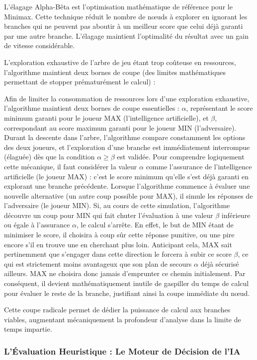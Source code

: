 \documentclass[a4paper]{article}
\begin{document}
L'élagage Alpha-Bêta est l'optimisation mathématique de référence pour le Minimax. Cette technique réduit le nombre de nœuds à explorer en ignorant les branches qui ne peuvent pas aboutir à un meilleur score que celui déjà garanti par une autre branche. L'élagage maintient l'optimalité du résultat avec un gain de vitesse considérable.

L'exploration exhaustive de l'arbre de jeu étant trop coûteuse en ressources, l'algorithme maintient deux bornes de coupe (des limites mathématiques permettant de stopper prématurément le calcul) :

Afin de limiter la consommation de ressources lors d'une exploration exhaustive, l'algorithme maintient deux bornes de coupe essentielles : $\alpha$, représentant le score minimum garanti pour le joueur MAX (l'intelligence artificielle), et $\beta$, correspondant au score maximum garanti pour le joueur MIN (l'adversaire).
Durant la descente dans l'arbre, l'algorithme compare constamment les options des deux joueurs, et l'exploration d'une branche est immédiatement interrompue (élaguée) dès que la condition $\alpha \ge \beta$ est validée. Pour comprendre logiquement cette mécanique, il faut considérer la valeur $\alpha$ comme l'assurance de l'intelligence artificielle (le joueur MAX) : c'est le score minimum qu'elle s'est déjà garanti en explorant une branche précédente. Lorsque l'algorithme commence à évaluer une nouvelle alternative (un autre coup possible pour MAX), il simule les réponses de l'adversaire (le joueur MIN). Si, au cours de cette simulation, l'algorithme découvre un coup pour MIN qui fait chuter l'évaluation à une valeur $\beta$ inférieure ou égale à l'assurance $\alpha$, le calcul s'arrête. En effet, le but de MIN étant de minimiser le score, il choisira à coup sûr cette réponse punitive, ou une pire encore s'il en trouve une en cherchant plus loin. Anticipant cela, MAX sait pertinemment que s'engager dans cette direction le forcera à subir ce score $\beta$, ce qui est strictement moins avantageux que son plan de secours $\alpha$ déjà sécurisé ailleurs. MAX ne choisira donc jamais d'emprunter ce chemin initialement. Par conséquent, il devient mathématiquement inutile de gaspiller du temps de calcul pour évaluer le reste de la branche, justifiant ainsi la coupe immédiate du nœud.

Cette coupe radicale permet de dédier la puissance de calcul aux branches viables, augmentant mécaniquement la profondeur d'analyse dans la limite de temps impartie.


\subsubsection{L'Évaluation Heuristique : Le Moteur de Décision de l'IA}
\end{document}
